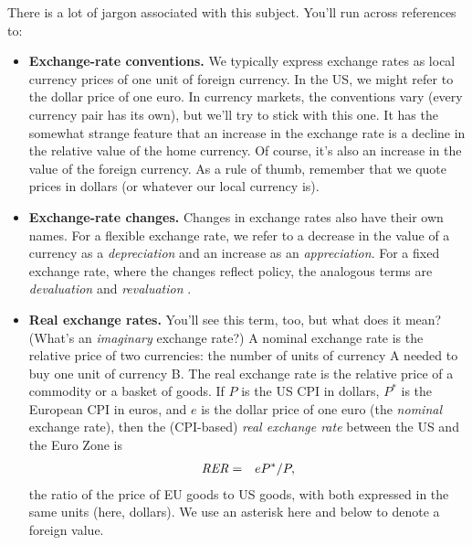 There is a lot  of jargon associated with this subject.
You'll run across references to:
%
\begin{itemize}

\item \textbf{Exchange-rate conventions.  }
%
We typically express exchange rates as local currency prices of
one unit of foreign currency. 
In the US, we might refer to the dollar price of one euro.
In currency markets, the conventions vary
(every currency pair has its own),
but we'll try to stick with this one.
It has the somewhat strange feature that
an increase in the exchange rate is a decline in the relative value of the home currency.
Of course, it's also an increase in the value of the foreign currency.
As a rule of thumb, remember that we quote prices in dollars
(or whatever our local currency is).

\item \textbf{Exchange-rate changes.}
Changes in exchange rates also have their own names.
For a flexible exchange rate,
we refer to a decrease in the value of a currency as a
{\it depreciation \/} and an increase as an {\it appreciation\/}. 
For a fixed exchange rate, where the changes reflect policy,
the analogous terms are {\it devaluation 
 \/} and {\it revaluation  
 \/}.

\item \textbf{Real exchange rates. }
You'll see this term, too, but what does it mean?
(What's an \emph{imaginary} exchange rate?)
A nominal exchange rate is the relative price of two currencies:
the number of units of currency A needed to buy one unit
of currency B.
The real exchange rate is the relative price of a commodity or
a basket of goods.
If $P$ is the US CPI in dollars, $P^*$ is the European CPI in euros,
and $e$ is the dollar price of one euro (the {\it nominal} exchange rate), then the (CPI-based) {\it real exchange rate\/} between the US and the Euro Zone is
\begin{eqnarray*}
    \mbox{\it RER\/}  &=& e P^* /P ,
\end{eqnarray*}
the ratio of the price of EU goods to US goods,
with both expressed in the same units (here, dollars).
We use an asterisk here and below to denote a foreign value.



\end{itemize}
